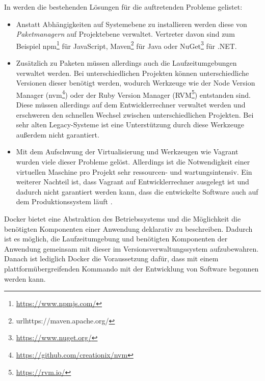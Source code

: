 In \autocite{smashing-local-devenv-docker:online} werden die bestehenden Lösungen für die auftretenden Probleme gelistet:
\begin{itemize}
    \item Anstatt Abhängigkeiten auf Systemebene zu installieren werden diese von \emph{Paketmanagern} auf Projektebene verwaltet.
    Vertreter davon sind zum Beispiel npm\footnote{\url{https://www.npmjs.com/}} für JavaScript, Maven\footnote{url{https://maven.apache.org/}} für Java oder NuGet\footnote{\url{https://www.nuget.org/}} für .NET.
    \item Zusätzlich zu Paketen müssen allerdings auch die Laufzeitumgebungen verwaltet werden.
    Bei unterschiedlichen Projekten können unterschiedliche Versionen dieser benötigt werden, wodurch Werkzeuge wie der Node Version Manager (nvm\footnote{\url{https://github.com/creationix/nvm}}) oder der Ruby Version Manager (RVM\footnote{\url{https://rvm.io/}}) entstanden sind.
    Diese müssen allerdings auf dem Entwicklerrechner verwaltet werden und erschweren den schnellen Wechsel zwischen unterschiedlichen Projekten.
    Bei sehr alten Legacy-Systeme ist eine Unterstützung durch diese Werkzeuge außerdem nicht garantiert.
    \item Mit dem Aufschwung der Virtualisierung und Werkzeugen wie Vagrant wurden viele dieser Probleme gelöst.
    Allerdings ist die Notwendigkeit einer virtuellen Maschine pro Projekt sehr ressourcen- und wartungsintensiv.
    Ein weiterer Nachteil ist, dass Vagrant auf Entwicklerrechner ausgelegt ist und dadurch nicht garantiert werden kann, dass die entwickelte Software auch auf dem Produktionssystem läuft \autocite{laradock-docs:online}.
\end{itemize}
Docker bietet eine Abstraktion des Betriebssystems und die Möglichkeit die benötigten Komponenten einer Anwendung deklarativ zu beschreiben.
Dadurch ist es möglich, die Laufzeitumgebung und benötigten Komponenten der Anwendung gemeinsam mit dieser im Versionsverwaltungssystem aufzubewahren.
Danach ist lediglich Docker die Voraussetzung dafür, dass mit einem plattformübergreifenden Kommando mit der Entwicklung von Software begonnen werden kann.

